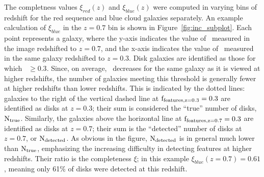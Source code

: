 \documentclass[useAMS,usenatbib]{mn2e}
\begin{document}
The completness values $\xi_{red}(z)$ and $\xi_{blue}(z)$ were computed in varying bins of redshift for the red sequence and blue cloud galaxies separately. An example calculation of $\xi_{blue}$ in the $z=0.7$ bin is shown in Figure~\ref{fig:inc_subplot}. Each point represents a  galaxy, where the y-axis indicates the value of \ffeatures~measured in the image redshifted to $z=0.7$, and the x-axis indicates the value of \ffeatures~measured in the same galaxy redshifted to $z=0.3$. Disk galaxies are identified as those for which \ffeatures~$\ge0.3$. Since, on average, \ffeatures~decreases for the same galaxy as it is viewed at higher redshifts, the number of galaxies meeting this threshold is generally fewer at higher redshifts than lower redshifts. This is indicated by the dotted lines: galaxies to the right of the vertical dashed line at $\rm f_{features,z=0.3}=0.3$ are identified as disks at $z=0.3$; their sum is considered the ``true'' number of disks, $\rm N_{true}$. Similarly, the galaxies above the horizontal line at $\rm f_{features,z=0.7}=0.3$ are identified as disks at $z=0.7$; their sum is the ``detected'' number of disks at $z=0.7$, or $\rm N_{detected}$. As obvious in the figure, $\rm N_{detected}$ is in general much lower than $\rm N_{true}$, emphasizing the increasing difficulty in detecting features at higher redshifts. Their ratio is the completeness $\xi$; in this example $\xi_{blue}(z=0.7)=0.61$, meaning only 61\% of disks were detected at this redshift. 
\end{document}
